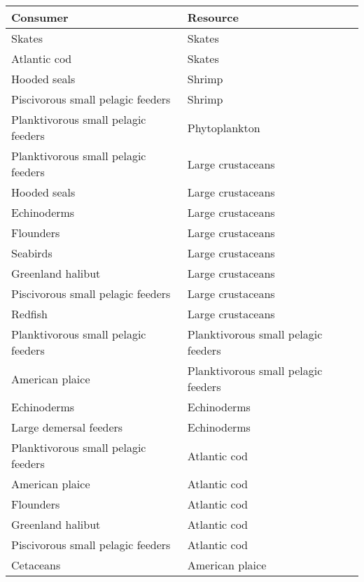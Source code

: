 \newpage
\begin{table}[h!]
    \centering
    \begin{tabular}{|l|l|}
      \hline
        Consumer               & Resource \\
      \hline    \hline
      Skates                              & Skates    \\
      Atlantic cod                        & Skates    \\
      Hooded seals                        & Shrimp    \\
      Piscivorous small pelagic feeders   & Shrimp    \\
      Planktivorous small pelagic feeders & Phytoplankton \\
      Planktivorous small pelagic feeders & Large crustaceans \\
      Hooded seals                        & Large crustaceans \\
      Echinoderms                         & Large crustaceans \\
      Flounders                           & Large crustaceans \\
      Seabirds                            & Large crustaceans \\
      Greenland halibut                   & Large crustaceans \\
      Piscivorous small pelagic feeders   & Large crustaceans \\
      Redfish                             & Large crustaceans \\
      Planktivorous small pelagic feeders & Planktivorous small pelagic feeders   \\
      American plaice                     & Planktivorous small pelagic feeders   \\
      Echinoderms                         & Echinoderms   \\
      Large demersal feeders              & Echinoderms   \\
      Planktivorous small pelagic feeders & Atlantic cod  \\
      American plaice                     & Atlantic cod  \\
      Flounders                           & Atlantic cod  \\
      Greenland halibut                   & Atlantic cod  \\
      Piscivorous small pelagic feeders   & Atlantic cod  \\
      Cetaceans                           & American plaice   \\

\end{tabular}
\end{table}
